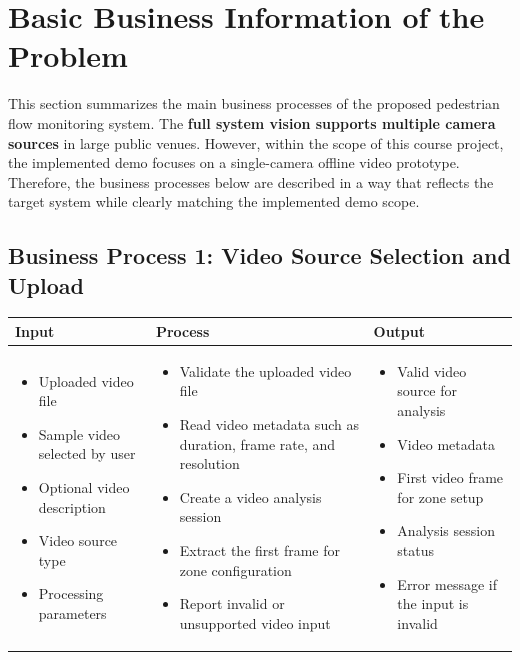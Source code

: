 \documentclass[12pt,a4paper]{report}
\begin{document}
\section{Basic Business Information of the Problem}
\label{sec:basic-business-information}

This section summarizes the main business processes of the proposed pedestrian flow monitoring system. 
The \textbf{full system vision supports multiple camera sources} in large public venues. 
However, within the scope of this course project, the implemented demo focuses on a single-camera offline video prototype. 
Therefore, the business processes below are described in a way that reflects the target system while clearly matching the implemented demo scope.

\subsection*{Business Process 1: Video Source Selection and Upload}
\begin{longtable}{|p{4.1cm}|p{5.0cm}|p{5.0cm}|}
\hline
\rowcolor{HeaderBlue}
\textbf{Input} & \textbf{Process} & \textbf{Output} \\
\hline

\begin{itemize}[leftmargin=*, nosep]
    \item Uploaded video file
    \item Sample video selected by user
    \item Optional video description
    \item Video source type
    \item Processing parameters
\end{itemize}
&
\begin{itemize}[leftmargin=*, nosep]
    \item Validate the uploaded video file
    \item Read video metadata such as duration, frame rate, and resolution
    \item Create a video analysis session
    \item Extract the first frame for zone configuration
    \item Report invalid or unsupported video input
\end{itemize}
&
\begin{itemize}[leftmargin=*, nosep]
    \item Valid video source for analysis
    \item Video metadata
    \item First video frame for zone setup
    \item Analysis session status
    \item Error message if the input is invalid
\end{itemize}
\\
\hline
\end{longtable}
\end{document}

